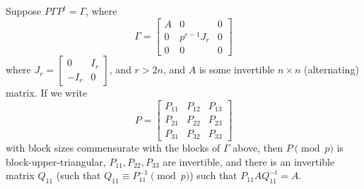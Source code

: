 \begin{lemma}\label{lem:invertible}
	Suppose $P \Gamma P^t = \Gamma$, where
	\[
	\Gamma = \begin{bmatrix}
		A & 0 & 0 \\ 
		0 & p^{e-1} J_r & 0 \\
		0 & 0 & 0 
	\end{bmatrix}
	\]
	where $J_r = \begin{bmatrix} 0 & I_r \\ -I_r & 0 \end{bmatrix}$, and $r > 2n$, and $A$ is some invertible $n \times n$ (alternating) matrix. If we write
	\[
	P = \begin{bmatrix} 
		P_{11} & P_{12} & P_{13} \\
		P_{21} & P_{22} & P_{23} \\
		P_{31} & P_{32} & P_{33}
	\end{bmatrix}
	\]
	with block sizes commensurate with the blocks of $\Gamma$ above, then $P \pmod{p}$ is block-upper-triangular, $P_{11}, P_{22}, P_{33}$ are invertible, and there is an invertible matrix $Q_{11}$ (such that $Q_{11} \equiv P_{11}^{-1} \pmod{p}$) such that $P_{11} A Q_{11}^{-t} = A$.
\end{lemma}

